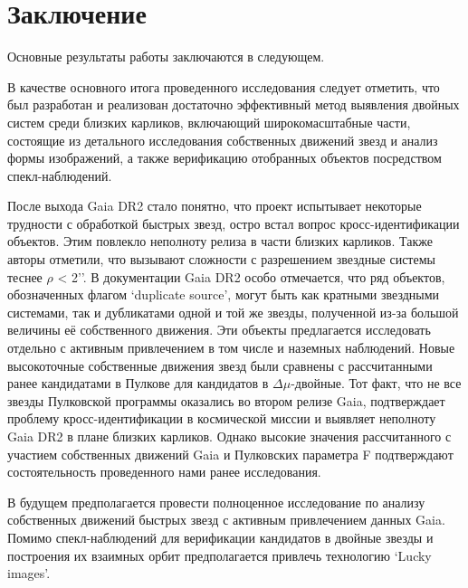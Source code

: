\chapter*{Заключение}                       %


Основные результаты работы заключаются в следующем.

В качестве основного итога проведенного исследования следует отметить, что был разработан и реализован достаточно эффективный метод выявления двойных систем среди близких карликов, включающий широкомасштабные части, состоящие из детального исследования собственных движений звезд и анализ формы изображений, а также верификацию отобранных объектов посредством спекл-наблюдений.

После выхода Gaia DR2 стало понятно, что проект испытывает некоторые трудности с обработкой быстрых звезд, остро встал вопрос кросс-идентификации объектов. Этим повлекло неполноту релиза в части близких карликов. Также авторы отметили, что вызывают сложности с разрешением звездные системы теснее $\rho$ < 2’’. В документации Gaia DR2 особо отмечается, что ряд объектов, обозначенных флагом ‘duplicate source’, могут быть как кратными звездными системами, так и дубликатами одной и той же звезды, полученной из-за большой величины её собственного движения. Эти объекты предлагается исследовать отдельно с активным привлечением в том числе и наземных наблюдений. Новые высокоточные собственные движения звезд были сравнены с рассчитанными ранее кандидатами в Пулкове для кандидатов в $\Delta\mu$-двойные. Тот факт, что не все звезды Пулковской программы оказались во втором релизе Gaia, подтверждает проблему кросс-идентификации в космической миссии и выявляет неполноту Gaia DR2 в плане близких карликов. Однако высокие значения рассчитанного с участием собственных движений Gaia и Пулковских параметра F подтверждают состоятельность проведенного нами ранее исследования.

В будущем предполагается провести полноценное исследование по анализу собственных движений быстрых звезд с активным привлечением данных Gaia. Помимо спекл-наблюдений для верификации кандидатов в двойные звезды и построения их взаимных орбит предполагается привлечь технологию ‘Lucky images’.
